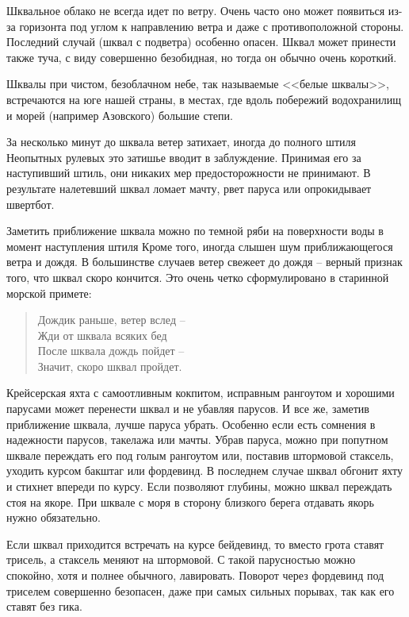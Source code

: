 \documentclass[a4paper, 12pt, twoside, final]{scrbook}
\begin{document}
Шквальное облако не всегда идет по ветру. Очень часто оно может появиться из-за горизонта под углом к направлению ветра и даже с противоположной стороны. Последний случай (шквал с подветра) особенно опасен. Шквал может принести также туча, с виду совершенно безобидная, но тогда он обычно очень короткий.

Шквалы при чистом, безоблачном небе, так называемые <<белые шквалы>>, встречаются на юге нашей страны, в местах, где вдоль побережий водохранилищ и морей (например Азовского) большие степи.

За несколько минут до шквала ветер затихает, иногда до полного штиля Неопытных рулевых это затишье вводит в заблуждение. Принимая его за наступивший штиль, они никаких мер предосторожности не принимают. В результате налетевший шквал ломает мачту, рвет паруса или опрокидывает швертбот.

Заметить приближение шквала можно по темной ряби на поверхности воды в момент наступления штиля Кроме того, иногда слышен шум приближающегося ветра и дождя. В большинстве случаев ветер свежеет до дождя \--- верный признак того, что шквал скоро кончится. Это очень четко сформулировано в старинной морской примете:

\begin{verse}
Дождик раньше, ветер вслед \--- \\
Жди от шквала всяких бед     \\
После шквала дождь пойдет \---   \\
Значит, скоро шквал пройдет. \\
\end{verse}

Крейсерская яхта с самоотливным кокпитом, исправным рангоутом и хорошими парусами может перенести шквал и не убавляя парусов. И все же, заметив приближение шквала, лучше паруса убрать. Особенно если есть сомнения в надежности парусов, такелажа или мачты. Убрав паруса, можно при попутном шквале переждать его под голым рангоутом или, поставив штормовой стаксель, уходить курсом бакштаг или фордевинд. В последнем случае шквал обгонит яхту и стихнет впереди по курсу. Если позволяют глубины, можно шквал переждать стоя на якоре. При шквале с моря в сторону близкого берега отдавать якорь нужно обязательно. 

Если шквал приходится встречать на курсе бейдевинд, то вместо грота ставят трисель, а стаксель меняют на штормовой. С такой парусностью можно спокойно, хотя и полнее обычного, лавировать. Поворот через фордевинд под триселем совершенно безопасен, даже при самых сильных порывах, так как его ставят без гика. 
\end{document}
